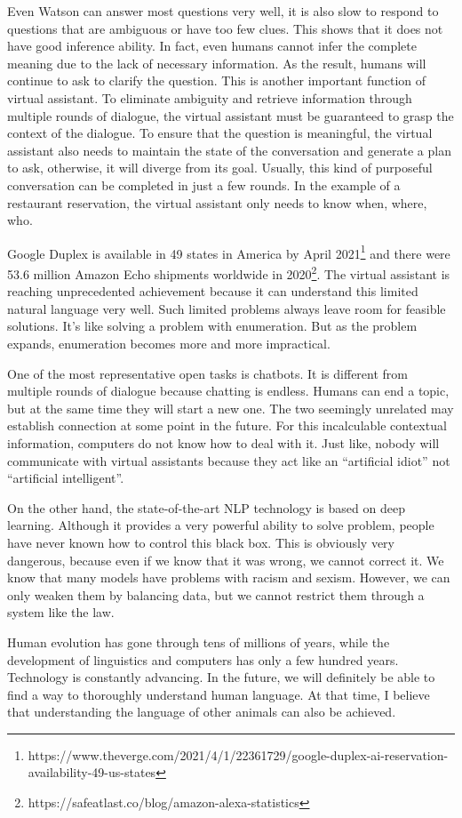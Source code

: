 \documentclass{article}
\begin{document}
Even Watson can answer most questions very well, it is also slow to respond to questions that are ambiguous or have too few clues. This shows that it does not have good inference ability. In fact, even humans cannot infer the complete meaning due to the lack of necessary information. As the result, humans will continue to ask to clarify the question. This is another important function of virtual assistant. To eliminate ambiguity and retrieve information through multiple rounds of dialogue, the virtual assistant must be guaranteed to grasp the context of the dialogue. To ensure that the question is meaningful, the virtual assistant also needs to maintain the state of the conversation and generate a plan to ask, otherwise, it will diverge from its goal. Usually, this kind of purposeful conversation can be completed in just a few rounds. In the example of a restaurant reservation, the virtual assistant only needs to know when, where, who.

Google Duplex is available in 49 states in America by April 2021\footnote{https://www.theverge.com/2021/4/1/22361729/google-duplex-ai-reservation-availability-49-us-states} and there were 53.6 million Amazon Echo shipments worldwide in 2020\footnote{https://safeatlast.co/blog/amazon-alexa-statistics}. The virtual assistant is reaching unprecedented achievement because it can understand this limited natural language very well. Such limited problems always leave room for feasible solutions. It's like solving a problem with enumeration. But as the problem expands, enumeration becomes more and more impractical.

One of the most representative open tasks is chatbots. It is different from multiple rounds of dialogue because chatting is endless. Humans can end a topic, but at the same time they will start a new one. The two seemingly unrelated may establish connection at some point in the future. For this incalculable contextual information, computers do not know how to deal with it. Just like, nobody will communicate with virtual assistants because they act like an “artificial idiot” not “artificial intelligent”.

On the other hand, the state-of-the-art NLP technology is based on deep learning. Although it provides a very powerful ability to solve problem, people have never known how to control this black box. This is obviously very dangerous, because even if we know that it was wrong, we cannot correct it. We know that many models have problems with racism and sexism. However, we can only weaken them by balancing data, but we cannot restrict them through a system like the law.

Human evolution has gone through tens of millions of years, while the development of linguistics and computers has only a few hundred years. Technology is constantly advancing. In the future, we will definitely be able to find a way to thoroughly understand human language. At that time, I believe that understanding the language of other animals can also be achieved.
\end{document}
